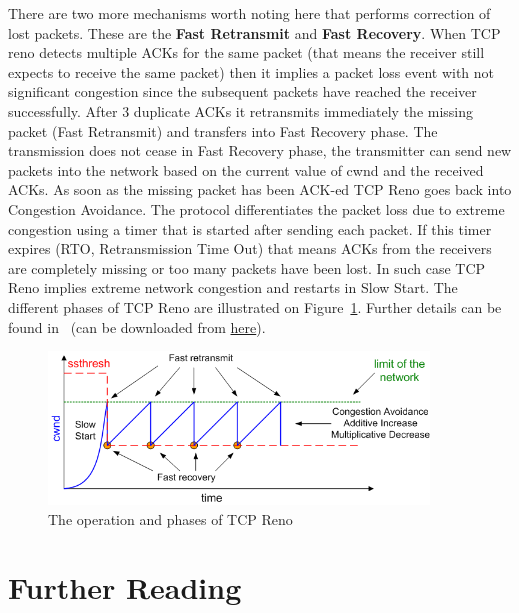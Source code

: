\documentclass[a4paper]{article}
\begin{document}
There are two more mechanisms worth noting here that performs correction of lost packets. These are the \textbf{Fast Retransmit} and \textbf{Fast Recovery}. When TCP reno detects multiple ACKs for the same packet (that means the receiver still expects to receive the same packet) then it implies a packet loss event with not significant congestion since the subsequent packets have reached the receiver successfully. After 3 duplicate ACKs it retransmits immediately the missing packet (Fast Retransmit) and transfers into Fast Recovery phase. The transmission does not cease in Fast Recovery phase, the transmitter can send new packets into the network based on the current value of cwnd and the received ACKs. As soon as the missing packet has been ACK-ed TCP Reno goes back into Congestion Avoidance. The protocol differentiates the packet loss due to extreme congestion using a timer that is started after sending each packet. If this timer expires (RTO, Retransmission Time Out) that means ACKs from the receivers are completely missing or too many packets have been lost. In such case TCP Reno implies extreme network congestion and restarts in Slow Start. The different phases of TCP Reno are illustrated on Figure~\ref{fig:TCP-Reno-operation}. Further details can be found in~\cite{CongestionAvoidance} (can be downloaded from \href{http://qosip.tmit.bme.hu/cgi-bin/twiki/viewfile/VITT5318/WebHome?rev=1;filename=jacobson88congestion.pdf}{here}).


\begin{figure}[H]
    \centering
    \includegraphics[width=0.9\textwidth]{figures/tcp-reno.png}
    \caption{The operation and phases of TCP Reno}
    \label{fig:TCP-Reno-operation}
\end{figure}

\section{Further Reading}
\end{document}
